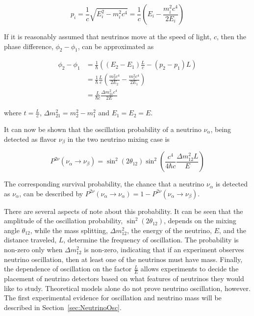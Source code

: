 \begin{equation}
	p_i = \frac{1}{c}\sqrt{E^2_i-m^2_ic^4 } = \frac{1}{c}\left(E_i - \frac{m^2_ic^4}{2E_i} \right)
\end{equation}

\noindent If it is reasonably assumed that neutrinos move at the speed of light, $c$, then
the phase difference, $\phi_2 - \phi_1$, can be approximated as

\begin{equation}
\begin{split}
	\phi_2 - \phi_1 &= \frac{1}{\hbar}\left( (E_2 - E_1)\frac{L}{c} - (p_2 - p_1)L  \right)\\
	&=\frac{1}{\hbar}\frac{L}{c}\left(\frac{m_2^2c^4}{2E_2} - \frac{m_1^2c^4}{2E_1}\right) \\
	&=\frac{L}{\hbar c}\frac{\Delta m^2_{21}c^4}{2E}
\end{split}
\end{equation}

\noindent where $t = \frac{L}{c}$, $\Delta m^2_{21} = m_2^2 - m_1^2$ and $E_1 = E_2 = E$.

It can now be shown that the oscillation probability of a neutrino $\nu_\alpha$, being detected as flavor $\nu_\beta$ in the two neutrino mixing case is

\begin{equation}
	P^{2\nu}(\nu_\alpha \rightarrow \nu_\beta) = \sin^2\left(2\theta_{12}\right)\sin^2\left(\frac{c^4}{4\hbar c}\frac{\Delta m^2_{12}L}{E}\right) 
\end{equation}

\noindent The corresponding survival probability, the chance that a neutrino $\nu_\alpha$ is detected as $\nu_\alpha$, can be described by $P^{2\nu}(\nu_\alpha \rightarrow \nu_\alpha) = 1 - P^{2\nu}(\nu_\alpha \rightarrow \nu_\beta)$.

There are several aspects of note about this probability. It can be seen that the amplitude of the oscillation probability, $\sin^2\left(2\theta_{12}\right)$, depends on the mixing angle $\theta_{12}$, while the mass splitting, $\Delta m^2_{12}$, the energy of the neutrino, $E$, and the distance traveled, $L$, determine the frequency of oscillation. 
The probability is non-zero only when $\Delta m^2_{12}$ is non-zero, indicating that if an experiment observes neutrino oscillation, then at least one of the neutrinos must have mass.
Finally, the dependence of oscillation on the factor $\frac{L}{E}$ allows experiments to decide the placement of neutrino detectors based on what features of neutrinos they would like to study. 
Theoretical models alone do not prove neutrino oscillation, however. The first experimental evidence for oscillation and neutrino mass will be described in Section~\ref{sec:NeutrinoOsc}.


